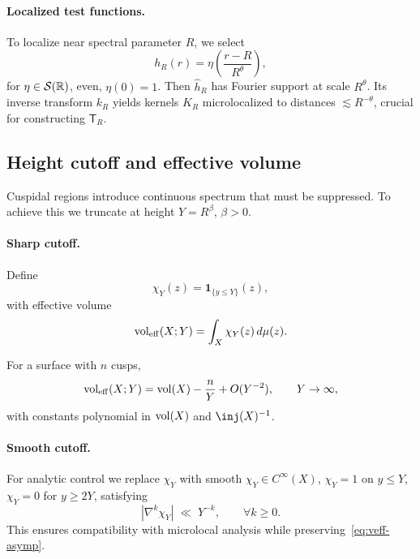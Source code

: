 \paragraph{Localized test functions.}
To localize near spectral parameter $R$, we select
\begin{equation}\label{eq:localized-test}
  h_R(r) = \eta\!\left(\frac{r-R}{R^\theta}\right),
\end{equation}
for $\eta\in\mathcal{S}(\mathbb{R})$, even, $\eta(0)=1$. Then $\widehat{h}_R$ has Fourier support at scale $R^\theta$. Its inverse transform $k_R$ yields kernels $K_R$ microlocalized to distances $\lesssim R^{-\theta}$, crucial for constructing $\mathsf{T}_R$.

\subsection{Height cutoff and effective volume}\label{subsec:cutoff}

Cuspidal regions introduce continuous spectrum that must be suppressed.  
To achieve this we truncate at height $Y=R^\beta$, $\beta>0$.

\paragraph{Sharp cutoff.}
Define
\begin{equation}\label{eq:sharp-cutoff}
  \chi_Y(z) = \mathbf{1}_{\{ y\le Y\}}(z),
\end{equation}
with effective volume
\begin{equation}\label{eq:effective-volume}
  \operatorname{vol}_{\mathrm{eff}}(X;Y) = \int_X \chi_Y(z)\,d\mu(z).
\end{equation}

\begin{lemma}\label{lem:veff}
For a surface with $n$ cusps,
\begin{equation}\label{eq:veff-asymp}
  \operatorname{vol}_{\mathrm{eff}}(X;Y) = \operatorname{vol}(X) - \frac{n}{Y} + O(Y^{-2}), \qquad Y\to\infty,
\end{equation}
with constants polynomial in $\operatorname{vol}(X)$ and $\inj(X)^{-1}$.
\end{lemma}

\paragraph{Smooth cutoff.}
For analytic control we replace $\chi_Y$ with smooth $\chi_Y\in C^\infty(X)$,  
$\chi_Y=1$ on $y\le Y$, $\chi_Y=0$ for $y\ge 2Y$, satisfying
\begin{equation}\label{eq:cutoff-derivatives}
  |\nabla^k \chi_Y| \;\ll\; Y^{-k}, \qquad \forall k\ge 0.
\end{equation}
This ensures compatibility with microlocal analysis while preserving~\eqref{eq:veff-asymp}.

